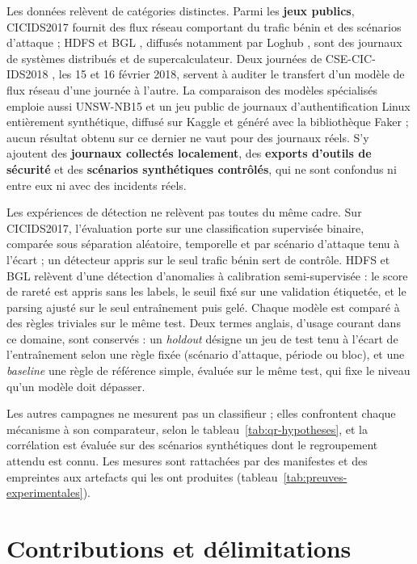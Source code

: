 Les données relèvent de catégories distinctes. Parmi les \textbf{jeux publics}, CICIDS2017 fournit des flux réseau comportant du trafic bénin et des scénarios d'attaque \cite{sharafaldin2018cicids} ; HDFS \cite{xu2009hdfs} et BGL \cite{oliner2007bgl}, diffusés notamment par Loghub \cite{zhu2023loghub}, sont des journaux de systèmes distribués et de supercalculateur. Deux journées de CSE-CIC-IDS2018 \cite{cic2018csecicids}, les 15 et 16 février 2018, servent à auditer le transfert d'un modèle de flux réseau d'une journée à l'autre. La comparaison des modèles spécialisés emploie aussi UNSW-NB15 et un jeu public de journaux d'authentification Linux entièrement synthétique, diffusé sur Kaggle et généré avec la bibliothèque Faker ; aucun résultat obtenu sur ce dernier ne vaut pour des journaux réels. S'y ajoutent des \textbf{journaux collectés localement}, des \textbf{exports d'outils de sécurité} et des \textbf{scénarios synthétiques contrôlés}, qui ne sont confondus ni entre eux ni avec des incidents réels.

Les expériences de détection ne relèvent pas toutes du même cadre. Sur CICIDS2017, l'évaluation porte sur une classification supervisée binaire, comparée sous séparation aléatoire, temporelle et par scénario d'attaque tenu à l'écart ; un détecteur appris sur le seul trafic bénin sert de contrôle. HDFS et BGL relèvent d'une détection d'anomalies à calibration semi-supervisée : le score de rareté est appris sans les labels, le seuil fixé sur une validation étiquetée, et le parsing ajusté sur le seul entraînement puis gelé. Chaque modèle est comparé à des règles triviales sur le même test. Deux termes anglais, d'usage courant dans ce domaine, sont conservés : un \textit{holdout} désigne un jeu de test tenu à l'écart de l'entraînement selon une règle fixée (scénario d'attaque, période ou bloc), et une \textit{baseline} une règle de référence simple, évaluée sur le même test, qui fixe le niveau qu'un modèle doit dépasser.

Les autres campagnes ne mesurent pas un classifieur ; elles confrontent chaque mécanisme à son comparateur, selon le tableau~\ref{tab:qr-hypotheses}, et la corrélation est évaluée sur des scénarios synthétiques dont le regroupement attendu est connu. Les mesures sont rattachées par des manifestes et des empreintes aux artefacts qui les ont produites (tableau~\ref{tab:preuves-experimentales}).


\section*{Contributions et délimitations}

